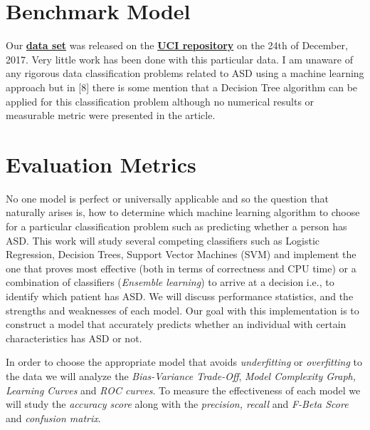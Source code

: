 \documentclass[12pt, oneside]{article}
\theoremstyle{definition}
\begin{document}
\section{Benchmark Model}
Our \href{https://archive.ics.uci.edu/ml/datasets/Autistic+Spectrum+Disorder+Screening+Data+for+Adolescent+++}{\textbf{data set}} was released on the \href{https://archive.ics.uci.edu/ml/index.php}{\textbf{UCI repository}} on the 24th of December, 2017. Very little work has been done with this particular data. 
I am unaware of any rigorous data classification problems related to ASD using a machine learning approach but in [8] there is some mention that a Decision Tree algorithm can be applied for this classification problem although no numerical results or measurable metric were presented in the article.
\section{Evaluation Metrics}
No one model is perfect or universally applicable and so the question that naturally arises is, how to determine which machine learning algorithm to choose for a particular classification problem such as predicting whether a person has ASD. This work will study several competing classifiers such as Logistic Regression, Decision Trees, Support Vector Machines (SVM) and implement the one that proves most effective (both in terms of correctness and CPU time) or a combination of classifiers ({\it Ensemble learning}) to arrive at a decision i.e., to identify which patient has ASD. We will discuss performance statistics, and the strengths and weaknesses of each model. Our goal with this implementation is to construct a model that accurately predicts whether an individual with certain characteristics has ASD or not. 

In order to choose the appropriate model that avoids {\it underfitting} or {\it overfitting} to the data  we will analyze the {\it Bias-Variance Trade-Off}, {\it Model Complexity Graph, Learning Curves} and {\it ROC curves}. To measure the effectiveness of each model we will study the {\it accuracy score} along with the {\it precision, recall} and {\it F-Beta Score} and {\it{confusion matrix}}.

\end{document}
